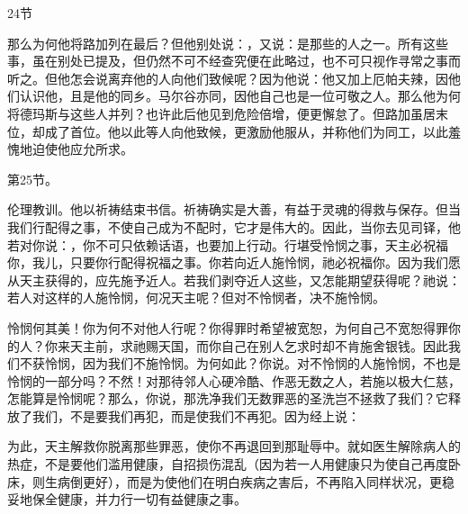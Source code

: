 24节  \par

那么为何他将路加列在最后？但他别处说：，又说：是那些的人之一。所有这些事，虽在别处已提及，但仍然不可不经查究便在此略过，也不可只视作寻常之事而听之。但他怎会说离弃他的人向他们致候呢？因为他说：他又加上厄帕夫辣，因他们认识他，且是他的同乡。马尔谷亦同，因他自己也是一位可敬之人。那么他为何将德玛斯与这些人并列？也许此后他见到危险倍增，便更懈怠了。但路加虽居末位，却成了首位。他以此等人向他致候，更激励他服从，并称他们为同工，以此羞愧地迫使他应允所求。\par

第25节。\par

伦理教训。他以祈祷结束书信。祈祷确实是大善，有益于灵魂的得救与保存。但当我们行配得之事，不使自己成为不配时，它才是伟大的。因此，当你去见司铎，他若对你说：，你不可只依赖话语，也要加上行动。行堪受怜悯之事，天主必祝福你，我儿，只要你行配得祝福之事。你若向近人施怜悯，祂必祝福你。因为我们愿从天主获得的，应先施予近人。若我们剥夺近人这些，又怎能期望获得呢？祂说：若人对这样的人施怜悯，何况天主呢？但对不怜悯者，决不施怜悯。\par

怜悯何其美！你为何不对他人行呢？你得罪时希望被宽恕，为何自己不宽恕得罪你的人？你来天主前，求祂赐天国，而你自己在别人乞求时却不肯施舍银钱。因此我们不获怜悯，因为我们不施怜悯。为何如此？你说。对不怜悯的人施怜悯，不也是怜悯的一部分吗？不然！对那待邻人心硬冷酷、作恶无数之人，若施以极大仁慈，怎能算是怜悯呢？那么，你说，那洗净我们无数罪恶的圣洗岂不拯救了我们？它释放了我们，不是要我们再犯，而是使我们不再犯。因为经上说：\par

为此，天主解救你脱离那些罪恶，使你不再退回到那耻辱中。就如医生解除病人的热症，不是要他们滥用健康，自招损伤混乱（因为若一人用健康只为使自己再度卧床，则生病倒更好），而是为使他们在明白疾病之害后，不再陷入同样状况，更稳妥地保全健康，并力行一切有益健康之事。\par

